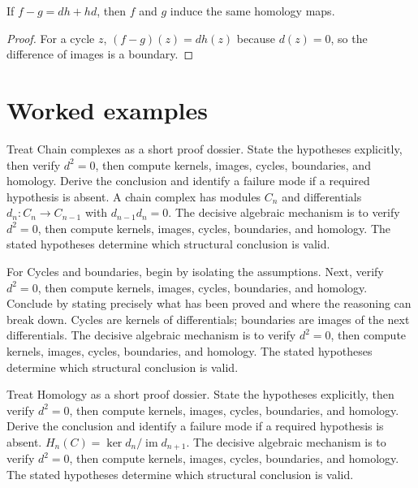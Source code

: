 \begin{theorem}\label{thm:v22-03}
If $f-g=dh+hd$, then $f$ and $g$ induce the same homology maps.
\begin{proof}
For a cycle $z$, $(f-g)(z)=d h(z)$ because $d(z)=0$, so the difference of images is a boundary.
\end{proof}
\end{theorem}

\section{Worked examples}

\begin{example}\label{ex:v22-worked-01}
Treat Chain complexes as a short proof dossier. State the hypotheses explicitly, then verify \(d^2=0\), then compute kernels, images, cycles, boundaries, and homology. Derive the conclusion and identify a failure mode if a required hypothesis is absent. A chain complex has modules $C_n$ and differentials $d_n:C_n\to C_{n-1}$ with $d_{n-1}d_n=0$. The decisive algebraic mechanism is to verify \(d^2=0\), then compute kernels, images, cycles, boundaries, and homology. The stated hypotheses determine which structural conclusion is valid.
\end{example}

\begin{example}\label{ex:v22-worked-02}
For Cycles and boundaries, begin by isolating the assumptions. Next, verify \(d^2=0\), then compute kernels, images, cycles, boundaries, and homology. Conclude by stating precisely what has been proved and where the reasoning can break down. Cycles are kernels of differentials; boundaries are images of the next differentials. The decisive algebraic mechanism is to verify \(d^2=0\), then compute kernels, images, cycles, boundaries, and homology. The stated hypotheses determine which structural conclusion is valid.
\end{example}

\begin{example}\label{ex:v22-worked-03}
Treat Homology as a short proof dossier. State the hypotheses explicitly, then verify \(d^2=0\), then compute kernels, images, cycles, boundaries, and homology. Derive the conclusion and identify a failure mode if a required hypothesis is absent. $H_n(C)=\ker d_n/\operatorname{im}d_{n+1}$. The decisive algebraic mechanism is to verify \(d^2=0\), then compute kernels, images, cycles, boundaries, and homology. The stated hypotheses determine which structural conclusion is valid.
\end{example}

